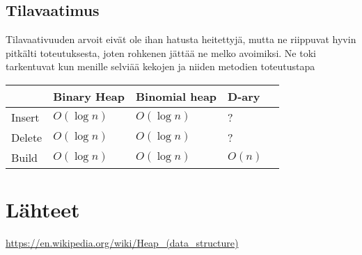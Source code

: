 \documentclass[a4paper,12pt]{article}
\begin{document}
\subsection{Tilavaatimus}
Tilavaativuuden arvoit eivät ole ihan hatusta heitettyjä, mutta ne riippuvat hyvin pitkälti toteutuksesta, joten rohkenen jättää ne melko avoimiksi. Ne toki tarkentuvat kun menille selviää kekojen  ja niiden metodien toteutustapa\\
\begin{tabular}{|l|l|l|l|l|}
\hline
&Binary Heap & Binomial heap & D-ary \\\hline
Insert & $O (\log n)$ & $O (\log n)$ & ?\\\hline
Delete  & $O (\log n)$ & $O (\log n)$ & ?\\\hline
Build & $O (\log n)$ & $O (\log n)$ & $O (n)$\\\hline
\end{tabular}


\section{Lähteet}
\url{https://en.wikipedia.org/wiki/Heap_(data_structure)}
\end{document}
